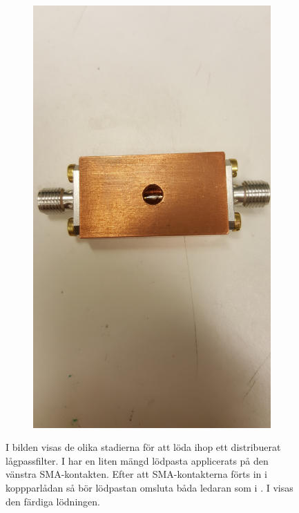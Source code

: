 \documentclass[main.tex]{subfiles}
\begin{document}
\begin{figure}[h]
\begin{subfigure}{0.25\textwidth}
        \includegraphics[angle=-90,trim=1200 100 1800 100,clip,width=0.97\linewidth]{figure/Filterbilder/filter_post_solder.jpg} 
        \caption{}
        \label{fig:post_solder}
    \end{subfigure}
    
 \caption{I bilden visas de olika stadierna för att löda ihop ett distribuerat lågpassfilter. I \protect{} har en liten mängd lödpasta applicerats på den vänstra SMA-kontakten. Efter att SMA-kontakterna förts in i koppparlådan så bör lödpastan omsluta båda ledaran som i . I  visas den färdiga lödningen.}
 \label{fig:filter_soldering}
\end{figure}
\end{document}
